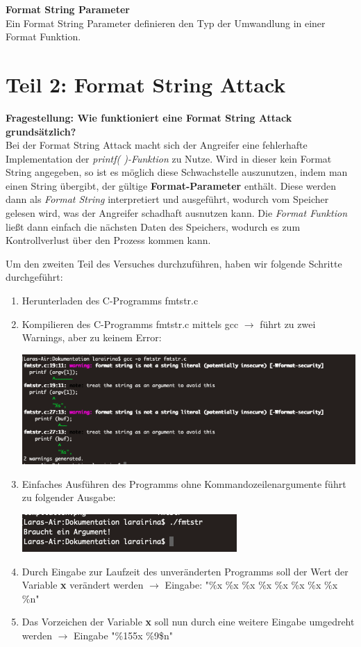 \documentclass[12pt,a4paper]{article}
\begin{document}
	\textbf{Format String Parameter} \\
	Ein Format String Parameter definieren den Typ der Umwandlung in einer Format Funktion.
	\bigskip

	
	\section*{Teil 2: Format String Attack}
	
	\textbf{Fragestellung: Wie funktioniert eine Format String Attack grundsätzlich?} \\
	Bei der Format String Attack macht sich der Angreifer eine fehlerhafte Implementation der \textit{printf( )-Funktion} zu Nutze. Wird in dieser kein Format String angegeben, so ist es möglich diese Schwachstelle auszunutzen, indem man einen String übergibt, der gültige \textbf{Format-Parameter} enthält. Diese werden dann als \textit{Format String} interpretiert und ausgeführt, wodurch vom Speicher gelesen wird, was der Angreifer schadhaft ausnutzen kann. Die \textit{Format Funktion} ließt dann einfach die nächsten Daten des Speichers, wodurch es zum Kontrollverlust über den Prozess kommen kann.
	\bigskip
	
	Um den zweiten Teil des Versuches durchzuführen, haben wir folgende Schritte durchgeführt:
	
	\begin{enumerate}
		\item Herunterladen des C-Programms fmtstr.c
		\item Kompilieren des C-Programms fmtstr.c mittels gcc $\rightarrow$ führt zu zwei Warnings, aber zu keinem Error:
			\begin{center}
			\includegraphics[scale=0.3]{compilation.png}
			\end{center}
		\item Einfaches Ausführen des Programms ohne Kommandozeilenargumente führt zu folgender Ausgabe:
		\begin{center}
			\includegraphics[scale=0.8]{ohneCmdln.png}
		\end{center}
		\item Durch Eingabe zur Laufzeit des unveränderten Programms soll der Wert der Variable \textbf{x} verändert werden  $\rightarrow$ Eingabe: "\%x \%x \%x \%x \%x \%x \%x \%x \%n"
		\item Das Vorzeichen der Variable \textbf{x} soll nun durch eine weitere Eingabe umgedreht werden $\rightarrow$ Eingabe "\%155x \%9\$n"
	\end{enumerate}
\end{document}
